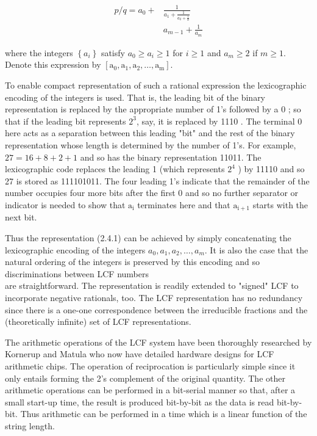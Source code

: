\documentclass[10pt]{article}
\begin{document}
\begin{align*}
p / q=a_{0}+ & \frac{1}{a_{1}+\frac{1}{a_{2}+\frac{1}{a}}}  \tag{2.4.1}\\
& a_{m-1}+\frac{1}{a_{m}}
\end{align*}


where the integers $\left\{a_{i}\right\}$ satisfy $a_{0} \geqslant a_{i} \geqslant 1$ for $i \geqslant 1$ and $a_{m} \geqslant 2$ if $m \geqslant 1$. Denote this expression by $\left[\mathrm{a}_{0}, \mathrm{a}_{1}, \mathrm{a}_{2}, \ldots, \mathrm{a}_{\mathrm{m}}\right]$.

To enable compact representation of such a rational expression the lexicographic encoding of the integers is used. That is, the leading bit of the binary representation is replaced by the appropriate number of 1's followed by a 0 ; so that if the leading bit represents $2^{3}$, say, it is replaced by 1110 . The terminal 0 here acts as a separation between this leading "bit" and the rest of the binary representation whose length is determined by the number of 1's. For example, $27=16+8+2+1$ and so has the binary representation 11011. The lexicographic code replaces the leading 1 (which represents $2^{4}$ ) by 11110 and so 27 is stored as 111101011. The four leading 1's indicate that the remainder of the number occupies four more bits after the first 0 and so no further separator or indicator is needed to show that $\mathrm{a}_{\mathrm{i}}$ terminates here and that $\mathrm{a}_{\mathrm{i}+1}$ starts with the next bit.

Thus the representation (2.4.1) can be achieved by simply concatenating the lexicographic encoding of the integers $a_{0}, a_{1}, a_{2}, \ldots, a_{m}$. It is also the case that the natural ordering of the integers is preserved by this encoding and so discriminations between LCF numbers\\
are straightforward. The representation is readily extended to "signed" LCF to incorporate negative rationals, too. The LCF representation has no redundancy since there is a one-one correspondence between the irreducible fractions and the (theoretically infinite) set of LCF representations.

The arithmetic operations of the LCF system have been thoroughly researched by Kornerup and Matula who now have detailed hardware designs for LCF arithmetic chips. The operation of reciprocation is particularly simple since it only entails forming the 2's complement of the original quantity. The other arithmetic operations can be performed in a bit-serial manner so that, after a small start-up time, the result is produced bit-by-bit as the data is read bit-by-bit. Thus arithmetic can be performed in a time which is a linear function of the string length.
\end{document}
